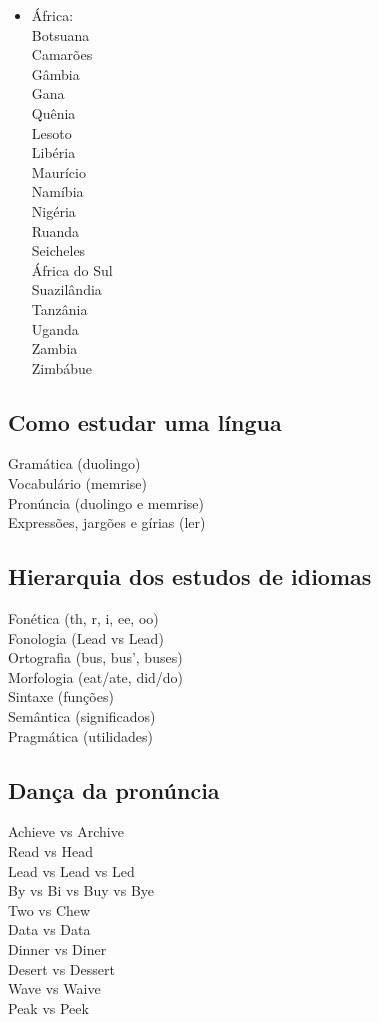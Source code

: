 \documentclass[12pt,a4paper]{article} %
\begin{document}
\begin{itemize}
\item África:\\
Botsuana\\
Camarões\\
Gâmbia\\
Gana\\
Quênia\\
Lesoto\\
Libéria\\
Maurício\\
Namíbia\\
Nigéria\\
Ruanda\\
Seicheles\\
África do Sul\\
Suazilândia\\
Tanzânia\\
Uganda\\
Zambia\\
Zimbábue
\end{itemize}
\subsection{Como estudar uma língua}

Gramática (duolingo)\\
Vocabulário (memrise)\\
Pronúncia (duolingo e memrise)\\
Expressões, jargões e gírias (ler)\\

\subsection{Hierarquia dos estudos de idiomas}

Fonética (th, r, i, ee, oo)\\
Fonologia (Lead vs Lead)\\
Ortografia (bus, bus', buses)\\
Morfologia (eat/ate, did/do)\\
Sintaxe (funções)\\
Semântica (significados)\\
Pragmática (utilidades)\\

\subsection{Dança da pronúncia}

Achieve vs Archive\\
Read vs Head\\
Lead vs Lead vs Led\\
By vs Bi vs Buy vs Bye\\
Two vs Chew\\
Data vs Data\\
Dinner vs Diner\\
Desert vs Dessert\\
Wave vs Waive\\
Peak vs Peek\\
\end{document}
